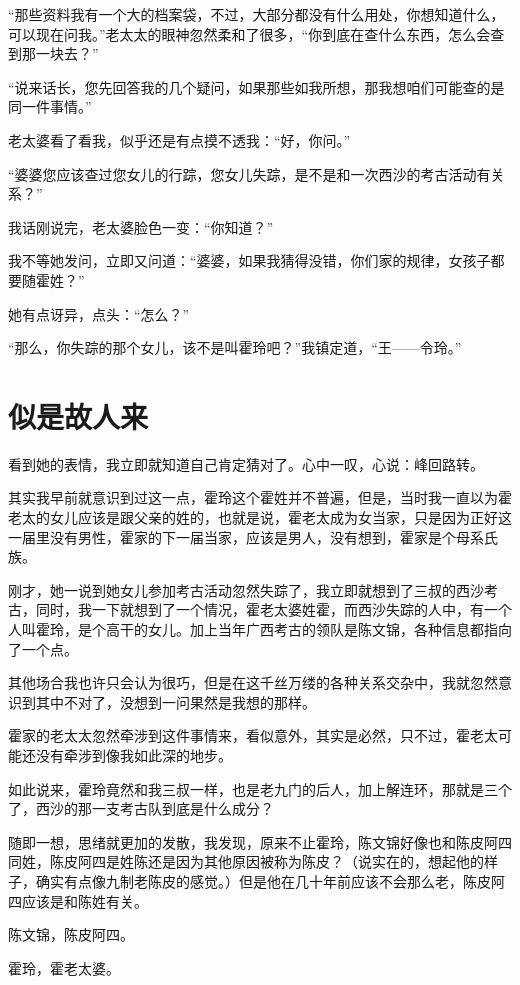 “那些资料我有一个大的档案袋，不过，大部分都没有什么用处，你想知道什么，可以现在问我。”老太太的眼神忽然柔和了很多，“你到底在查什么东西，怎么会查到那一块去？”

“说来话长，您先回答我的几个疑问，如果那些如我所想，那我想咱们可能查的是同一件事情。”

老太婆看了看我，似乎还是有点摸不透我：“好，你问。”

“婆婆您应该查过您女儿的行踪，您女儿失踪，是不是和一次西沙的考古活动有关系？”

我话刚说完，老太婆脸色一变：“你知道？”

我不等她发问，立即又问道：“婆婆，如果我猜得没错，你们家的规律，女孩子都要随霍姓？”

她有点讶异，点头：“怎么？”

“那么，你失踪的那个女儿，该不是叫霍玲吧？”我镇定道，“王——令玲。”

\chapter{似是故人来}

看到她的表情，我立即就知道自己肯定猜对了。心中一叹，心说：峰回路转。

其实我早前就意识到过这一点，霍玲这个霍姓并不普遍，但是，当时我一直以为霍老太的女儿应该是跟父亲的姓的，也就是说，霍老太成为女当家，只是因为正好这一届里没有男性，霍家的下一届当家，应该是男人，没有想到，霍家是个母系氏族。

刚才，她一说到她女儿参加考古活动忽然失踪了，我立即就想到了三叔的西沙考古，同时，我一下就想到了一个情况，霍老太婆姓霍，而西沙失踪的人中，有一个人叫霍玲，是个高干的女儿。加上当年广西考古的领队是陈文锦，各种信息都指向了一个点。

其他场合我也许只会认为很巧，但是在这千丝万缕的各种关系交杂中，我就忽然意识到其中不对了，没想到一问果然是我想的那样。

霍家的老太太忽然牵涉到这件事情来，看似意外，其实是必然，只不过，霍老太可能还没有牵涉到像我如此深的地步。

如此说来，霍玲竟然和我三叔一样，也是老九门的后人，加上解连环，那就是三个了，西沙的那一支考古队到底是什么成分？

随即一想，思绪就更加的发散，我发现，原来不止霍玲，陈文锦好像也和陈皮阿四同姓，陈皮阿四是姓陈还是因为其他原因被称为陈皮？（说实在的，想起他的样子，确实有点像九制老陈皮的感觉。）但是他在几十年前应该不会那么老，陈皮阿四应该是和陈姓有关。

陈文锦，陈皮阿四。

霍玲，霍老太婆。

